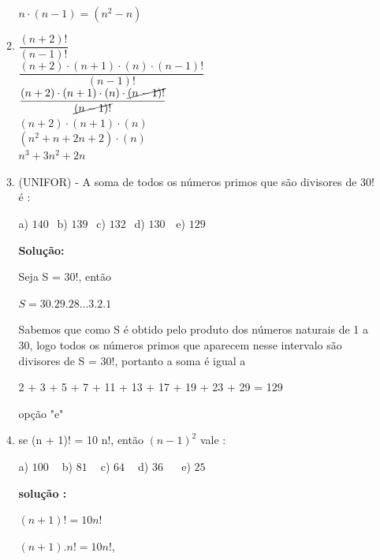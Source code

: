 \begin{multicols*}{2}
\begin{enumerate}
\begin{enumerate}
                        $  {n \cdot (n - 1)} = (n^2 - n) $\\

                  \item 	$ \dfrac{(n + 2)!}{(n - 1)!} $\\

                        $ \dfrac{(n + 2) \cdot (n + 1) \cdot (n) \cdot (n - 1)!}{(n - 1)!} $\\

                        $ \dfrac{(n + 2) \cdot (n + 1) \cdot (n) \cdot \cancel{(n - 1)!}}{\cancel{(n - 1)!}} $\\

                        $(n + 2) \cdot (n + 1) \cdot (n) $\\

                        $(n^2 + n + 2n + 2) \cdot (n) $\\

                        $n^3 + 3 n^2 + 2n $

                  \item (UNIFOR) - A soma de todos os números primos que são divisores de 30! é :

                        a) $140 \ \ $ b) $139 \ \ $ c) $132 \ \ $ d) $130 \ \ \ $ e) $129 \ \ $

                        \textbf{Solução:}

                        Seja S = $30!$, então

                        $ S = 30.29.28...3.2.1$

                        Sabemos que como S é obtido pelo produto dos números naturais de 1 a 30, logo todos os números primos que aparecem nesse intervalo são divisores de S = 30!, portanto a soma  é igual a

                        2 + 3 + 5 + 7 + 11 + 13 + 17 + 19 + 23 + 29 = 129

                        opção "e"

                  \item se (n + 1)! = 10 n!, então $( n - 1 )^2 $ vale :

                        a) $100 \ \ \ \ $ b) $81 \ \ \ \ $ c) $64 \ \ \ \ $ d) $36 \ \ \ \ \ \ $ e) $25 \ \ $

                        \textbf{solução :}

                        $(n+1)! = 10 n!$

                        $(n+1) . n! = 10 n!$,


\end{enumerate}
\end{enumerate}
\end{multicols*}
